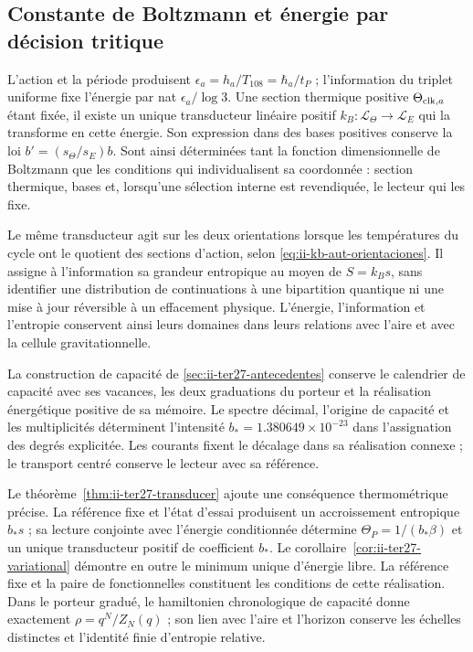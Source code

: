 \subsection{Constante de Boltzmann et énergie par décision tritique}

L’action et la période produisent
\(\epsilon_a=h_a/T_{108}=\hbar_a/t_P\) ; l’information du triplet
uniforme fixe l’énergie par nat \(\epsilon_a/\log3\).
Une section thermique positive \(\Theta_{{\rm clk},a}\) étant fixée,
il existe un unique transducteur linéaire positif
\(k_B:\mathcal L_\Theta\to\mathcal L_E\) qui la transforme en cette
énergie. Son expression dans des bases positives conserve la loi
\(b'=(s_\Theta/s_E)b\). Sont ainsi déterminées tant la fonction
dimensionnelle de Boltzmann que les conditions qui individualisent sa
coordonnée : section thermique, bases et, lorsqu’une sélection
interne est revendiquée, le lecteur qui les fixe.

Le même transducteur agit sur les deux orientations lorsque les
températures du cycle ont le quotient des sections d’action,
selon \eqref{eq:ii-kb-aut-orientaciones}. Il assigne à l’information
sa grandeur entropique au moyen de \(S=k_Bs\), sans identifier une distribution
de continuations à une bipartition quantique ni une mise à jour
réversible à un effacement physique. L’énergie, l’information et
l’entropie conservent ainsi leurs domaines dans leurs relations avec l’aire et
avec la cellule gravitationnelle.

La construction de capacité de \ref{sec:ii-ter27-antecedentes} conserve le calendrier
de capacité avec ses vacances, les deux graduations du porteur et la
réalisation énergétique positive de sa mémoire. Le spectre décimal,
l’origine de capacité et les multiplicités déterminent l’intensité
\(b_*=1.380649\times10^{-23}\) dans l’assignation des degrés explicitée.
Les courants fixent le décalage dans sa réalisation connexe ; le transport
centré conserve le lecteur avec sa référence.

Le théorème~\ref{thm:ii-ter27-transducer} ajoute une conséquence
thermométrique précise. La référence fixe et l’état d’essai produisent
un accroissement entropique \(b_*s\) ; sa lecture conjointe avec l’énergie
conditionnée détermine \(\Theta_P=1/(b_*\beta)\) et un unique
transducteur positif de coefficient \(b_*\). Le
corollaire~\ref{cor:ii-ter27-variational} démontre en outre le minimum
unique d’énergie libre. La référence fixe et la paire de fonctionnelles
constituent les conditions de cette réalisation. Dans le porteur gradué,
le hamiltonien chronologique de capacité donne exactement
\(\rho=q^N/Z_N(q)\) ; son lien avec l’aire et l’horizon conserve les
échelles distinctes et l’identité finie d’entropie relative.

